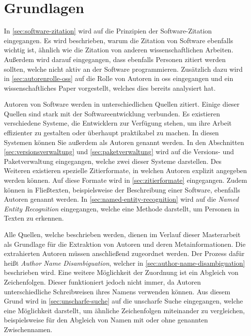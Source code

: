 \chapter{Grundlagen}
\label{chap:grundlagen}
In \autoref{sec:software-zitation} wird auf die Prinzipien der Software-Zitation eingegangen.
Es wird beschrieben, warum die Zitation von Software ebenfalls wichtig ist, ähnlich wie die Zitation von anderen wissenschaftlichen Arbeiten.
Außerdem wird darauf eingegangen, dass ebenfalls Personen zitiert werden sollten, welche nicht aktiv an der Software programmieren.
Zusätzlich dazu wird in \autoref{sec:autorenrolle-oss} auf die Rolle von Autoren in \gls{oss} eingegangen und ein wissenschaftliches Paper vorgestellt, welches dies bereits analysiert hat.

Autoren von Software werden in unterschiedlichen Quellen zitiert.
Einige dieser Quellen sind stark mit der Softwareentwicklung verbunden.
Es existieren verschiedene Systeme, die Entwicklern zur Verfügung stehen, um ihre Arbeit effizienter zu gestalten oder überhaupt praktikabel zu machen.
In diesen Systemen können Sie außerdem als Autoren genannt werden.
In den Abschnitten \ref{sec:versionsverwaltung} und \ref{sec:paketverwaltung} wird auf die Versions- und Paketverwaltung eingegangen, welche zwei dieser Systeme darstellen.
Des Weiteren existieren spezielle Zitierformate, in welchen Autoren explizit angegeben werden können.
Auf diese Formate wird in \autoref{sec:zitierformate} eingegangen.
Zudem können in Fließtexten, beispielsweise der Beschreibung einer Software, ebenfalls Autoren genannt werden.
In \autoref{sec:named-entity-recognition} wird auf die \emph{Named Entity Recognition} eingegangen, welche eine Methode darstellt, um Personen in Texten zu erkennen.

Alle Quellen, welche beschrieben werden, dienen im Verlauf dieser Masterarbeit als Grundlage für die Extraktion von Autoren und deren Metainformationen.
Die extrahierten Autoren müssen anschließend zugeordnet werden.
Der Prozess dafür heißt \emph{Author Name Disambiguation}, welcher in \autoref{sec:author-name-disambiguation} beschrieben wird.
Eine weitere Möglichkeit der Zuordnung ist ein Abgleich von Zeichenfolgen.
Dieser funktioniert jedoch nicht immer, da Autoren unterschiedliche Schreibweisen ihres Namens verwenden können.
Aus diesem Grund wird in \autoref{sec:unscharfe-suche} auf die unscharfe Suche eingegangen, welche eine Möglichkeit darstellt, um ähnliche Zeichenfolgen miteinander zu vergleichen, beispielsweise für den Abgleich von Namen mit oder ohne genannten Zwischennamen.








